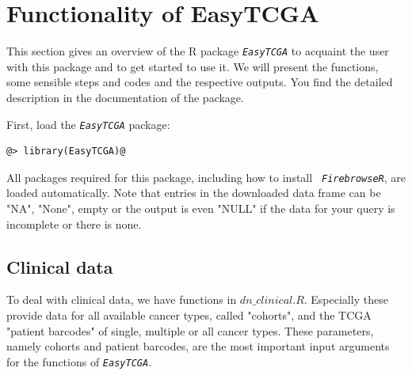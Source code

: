 \documentclass{TechReport}
\begin{document}
\section{Functionality of EasyTCGA}
This section gives an overview of the R package \texttt{\em EasyTCGA} to acquaint
the user with this package and to get started to use it.
We will present the functions, some sensible steps and codes and the respective
outputs. You find the detailed description in the
documentation of the package.

First, load the \texttt{\em EasyTCGA} package:
\begin{lstlisting}[style=base]
@> library(EasyTCGA)@
\end{lstlisting}
All packages required for this package, including how to install \texttt{\em
  FirebrowseR}, are loaded automatically. 
Note that entries in the downloaded data frame can be "NA", "None", empty or the output is even
"NULL" if the data for your query is incomplete or there is none.\\

\subsection{Clinical data}
To deal with clinical data, we have functions in $dn\_clinical.R$.
Especially these provide data for all available cancer types, called
"cohorts", and the TCGA "patient barcodes" of single, multiple or all
cancer types. These parameters, namely cohorts and patient barcodes,
are the most important input arguments for the functions of
\texttt{\em EasyTCGA}.
\end{document}
